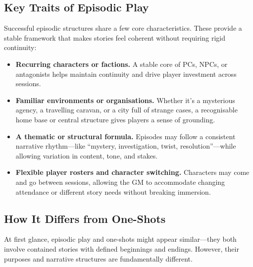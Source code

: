 \subsection*{Key Traits of Episodic Play}

Successful episodic structures share a few core characteristics. These provide a stable framework that makes stories feel coherent without requiring rigid continuity:

\begin{itemize}
    \item \textbf{Recurring characters or factions.} A stable core of PCs, NPCs, or antagonists helps maintain continuity and drive player investment across sessions.
    
    \item \textbf{Familiar environments or organisations.} Whether it's a mysterious agency, a travelling caravan, or a city full of strange cases, a recognisable home base or central structure gives players a sense of grounding.

    \item \textbf{A thematic or structural formula.} Episodes may follow a consistent narrative rhythm—like “mystery, investigation, twist, resolution”—while allowing variation in content, tone, and stakes.

    \item \textbf{Flexible player rosters and character switching.} Characters may come and go between sessions, allowing the GM to accommodate changing attendance or different story needs without breaking immersion.
\end{itemize}

\subsection*{How It Differs from One-Shots}

At first glance, episodic play and one-shots might appear similar—they both involve contained stories with defined beginnings and endings. However, their purposes and narrative structures are fundamentally different.


